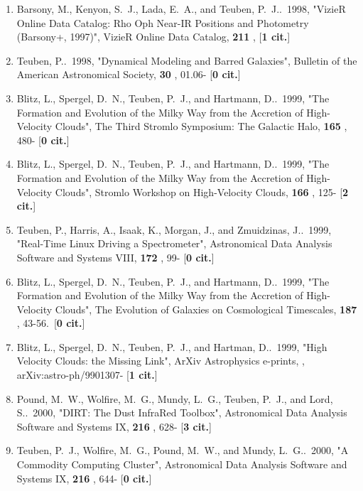 \documentclass[11pt,letterpaper]{article}
\begin{document}
\begin{enumerate}[resume,label=\textbf{\arabic*}.]
\item  
Barsony, M., Kenyon, S.~J., Lada, E.~A., and Teuben, P.~J..\  1998,  
"VizieR Online Data Catalog: Rho Oph Near-IR Positions and Photometry 
(Barsony+, 1997)", VizieR Online Data Catalog,  {\bf 211} ,  [{\bf 1 cit.}] 

\item  
Teuben, P..\  1998,  "Dynamical Modeling and Barred Galaxies", Bulletin of 
the American Astronomical Society,  {\bf 30} , 01.06- [{\bf 0 cit.}] 

\item  
Blitz, L., Spergel, D.~N., Teuben, P.~J., and Hartmann, D..\  1999,  "The 
Formation and Evolution of the Milky Way from the Accretion of 
High-Velocity Clouds", The Third Stromlo Symposium: The Galactic Halo,  
{\bf 165} , 480- [{\bf 0 cit.}] 

\item  
Blitz, L., Spergel, D.~N., Teuben, P.~J., and Hartmann, D..\  1999,  "The 
Formation and Evolution of the Milky Way from the Accretion of 
High-Velocity Clouds", Stromlo Workshop on High-Velocity Clouds,  {\bf 166} 
, 125- [{\bf 2 cit.}] 

\item  
Teuben, P., Harris, A., Isaak, K., Morgan, J., and Zmuidzinas, J..\  1999,  
"Real-Time Linux Driving a Spectrometer", Astronomical Data Analysis 
Software and Systems VIII,  {\bf 172} , 99- [{\bf 0 cit.}] 

\item  
Blitz, L., Spergel, D.~N., Teuben, P.~J., and Hartmann, D..\  1999,  "The 
Formation and Evolution of the Milky Way from the Accretion of 
High-Velocity Clouds", The Evolution of Galaxies on Cosmological 
Timescales,  {\bf 187} , 43-56.\  [{\bf 0 cit.}] 

\item  
Blitz, L., Spergel, D.~N., Teuben, P.~J., and Hartman, D..\  1999,  "High 
Velocity Clouds: the Missing Link", ArXiv Astrophysics e-prints,  , 
arXiv:astro-ph/9901307- [{\bf 1 cit.}] 

\item  
Pound, M.~W., Wolfire, M.~G., Mundy, L.~G., Teuben, P.~J., and Lord, S..\  
2000,  "DIRT: The Dust InfraRed Toolbox", Astronomical Data Analysis 
Software and Systems IX,  {\bf 216} , 628- [{\bf 3 cit.}] 

\item  
Teuben, P.~J., Wolfire, M.~G., Pound, M.~W., and Mundy, L.~G..\  2000,  "A 
Commodity Computing Cluster", Astronomical Data Analysis Software and 
Systems IX,  {\bf 216} , 644- [{\bf 0 cit.}] 


\end{enumerate}
\end{document}
